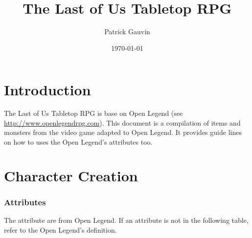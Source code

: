 \documentclass[10pt,twoside,twocolumn]{book}
\title{The Last of Us Tabletop RPG}
\date{\today}
\author{Patrick Gauvin}
\begin{document}
\selectfont %
\frontmatter

\maketitle
\begin{multicols}{2}
\tableofcontents
\end{multicols}

\onecolumn
\chapter{Introduction}
The Last of Us Tabletop RPG is base on Open Legend (see \href{http://www.openlegendrpg.com}{http://www.openlegendrpg.com}). 
This document is a compilation of items and monsters from the video game adapted to Open Legend. It provides guide lines on 
how to uses the Open Legend's attributes too.

%
%
\mainmatter
\chapter{Character Creation}

\subsection{Attributes}

The attribute are from Open Legend. If an attribute is not in the following table, refer to the Open Legend's definition.
\end{document}
